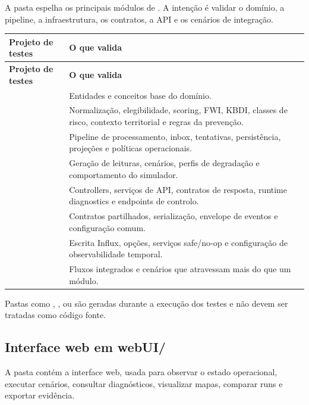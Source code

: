 A pasta  espelha os principais módulos de . A intenção é validar o domínio, a pipeline, a infraestrutura, os contratos, a API e os cenários de integração.

\begin{longtable}{L{0.40\textwidth} L{0.50\textwidth}}
\toprule
\textbf{Projeto de testes} & \textbf{O que valida} \\
\midrule
\endfirsthead
\toprule
\textbf{Projeto de testes} & \textbf{O que valida} \\
\midrule
\endhead
{} & Entidades e conceitos base do domínio. \\
 & Normalização, elegibilidade, scoring, FWI, KBDI, classes de risco, contexto territorial e regras da prevenção. \\
 & Pipeline de processamento, inbox, tentativas, persistência, projeções e políticas operacionais. \\
 & Geração de leituras, cenários, perfis de degradação e comportamento do simulador. \\
 & Controllers, serviços de API, contratos de resposta, runtime diagnostics e endpoints de controlo. \\
 & Contratos partilhados, serialização, envelope de eventos e configuração comum. \\
 & Escrita Influx, opções, serviços safe/no-op e configuração de observabilidade temporal. \\
 & Fluxos integrados e cenários que atravessam mais do que um módulo. \\
\bottomrule
\end{longtable}

Pastas como , ,  ou  são geradas durante a execução dos testes e não devem ser tratadas como código fonte.

\subsection{Interface web em webUI/}

A pasta  contém a interface web, usada para observar o estado operacional, executar cenários, consultar diagnósticos, visualizar mapas, comparar runs e exportar evidência.

